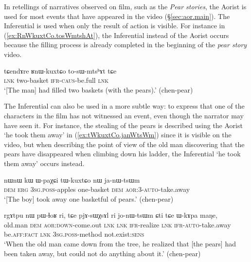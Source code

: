 In retellings of narratives observed on film, such as the \textit{Pear stories}, the Aorist is used for most events that have appeared in the video (§\ref{sec:aor.main}). The Inferential is used when only the result of action is visible. For instance in (\ref{ex:RnWkuxtCo.tosWmtshAt}), the Inferential  instead of the Aorist  occurs because the filling process is already completed in the beginning of the \textit{pear story} video.

\begin{exe}
\ex \label{ex:RnWkuxtCo.tosWmtshAt}
\gll tɕendɤre ʁnɯ-kuxtɕo to-sɯ-mtsʰɤt tɕe \\
\textsc{lnk} two-basket \textsc{ifr}-\textsc{caus}-be.full \textsc{lnk} \\
\glt `[The man] had filled two baskets (with the pears).' (chen-pear)
 \end{exe}

The Inferential can also be used in a more subtle way: to express that one of the characters in the film has not witnessed an event, even though the narrator may have seen it. For instance, the stealing of the pears is described using the Aorist  `he took them away' in (\ref{ex:tWkuxtCo.janWtsWm}) since it is visible on the video, but when describing the point of view of the old man discovering that the pears have disappeared when climbing down his ladder, the Inferential  `he took them away' occurs instead.

\begin{exe}
\ex \label{ex:tWkuxtCo.janWtsWm}
\gll nɯnɯ kɯ ɯ-paχɕi tɯ-kuxtɕo nɯ ja-nɯ-tsɯm \\
\textsc{dem} \textsc{erg} \textsc{3sg}.\textsc{poss}-apples one-basket \textsc{dem} \textsc{aor}:3\flobv{}-\textsc{auto}-take.away \\
\glt `[The boy] took away one basketful of pears.' (chen-pear)
 \end{exe}
 
\begin{exe}
\ex \label{ex:jonWtsWm.Cti}
\gll rgɤtpu nɯ pɯ-ɬoʁ ri, tɕe pjɤ-sɯχsɤl ri jo-nɯ-tsɯm ɕti tɕe ɯ-kɤpa maŋe,  \\
old.man \textsc{dem} \textsc{aor}:\textsc{down}-come.out \textsc{lnk} \textsc{lnk} \textsc{ifr}-realize \textsc{lnk} \textsc{ifr}-\textsc{auto}-take.away be.\textsc{aff}:\textsc{fact} \textsc{lnk} \textsc{3sg}.\textsc{poss}-method not.exist:\textsc{sens} \\
\glt `When the old man came down from the tree, he realized that [the pears] had been taken away, but could not do anything about it.' (chen-pear)
 \end{exe}

